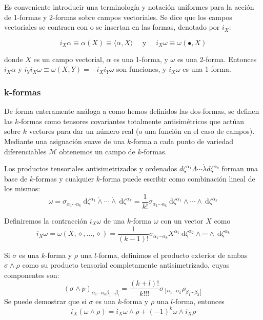 Es conveniente introducir una terminología y notación uniformes para la acción de 1-formas y 2-formas sobre campos vectoriales. Se dice que los campos vectoriales se contraen con o se insertan en las formas, denotado por \( i_{X} \):

$$
i_{X} \alpha \equiv \alpha(X) \equiv \langle \alpha, X \rangle \quad \text { y } \quad i_{X} \omega \equiv \omega(\bullet, X) \tag{5.69}
$$

donde \( X \) es un campo vectorial, \( \alpha \) es una 1-forma, y \( \omega \) es una 2-forma. Entonces \( i_{X} \alpha \) y \( i_{Y} i_{X} \omega \equiv \omega(X, Y) = -i_{X} i_{Y} \omega \) son funciones, y \( i_{X} \omega \) es una 1-forma.
\subsubsection{k-formas}

De forma enteramente análoga a como hemos definidos las dos-formas, se definen las $k$-formas como tensores covariantes totalmente antisimétricos que actúan sobre $k$ vectores para dar un número real (o una función en el caso de campos). Mediante una asignación suave de una $k$-forma a cada punto de variedad diferenciables $\mathscr{M}$ obtenemos un campo de $k$-formas.

Los productos tensoriales antisimetrizados y ordenados $d \zeta^{\alpha_{1}} \dot{\Lambda} \cdots \dot{\lambda} d \zeta^{\alpha_{k}}$ forman una base de $k$-formas y cualquier $k$-forma puede escribir como combinación lineal de los mismos:
$$
\omega=\sigma_{\alpha_{1} \cdots \alpha_{k}} \mathrm{~d} \zeta^{\alpha_{1}} \dot{\wedge} \cdots \dot{\wedge} \mathrm{~d} \zeta^{\alpha_{k}}=\frac{1}{k!} \sigma_{\alpha_{1} \cdots \alpha_{k}} \mathrm{~d} \zeta^{\alpha_{1}} \wedge \cdots \wedge \mathrm{~d} \zeta^{\alpha_{k}}
$$

Definiremos la contracción $i_{X} \omega$ de una $k$-forma $\omega$ con un vector $X$ como
$$
i_{X} \omega=\omega(X, \diamond, \ldots, \diamond)=\frac{1}{(k-1)!} \sigma_{\alpha_{1} \cdots \alpha_{k}} X^{\alpha_{1}} \mathrm{~d} \zeta^{\alpha_{2}} \wedge \cdots \wedge \mathrm{~d} \zeta^{\alpha_{k}}
$$

Si $\sigma$ es una $k$-forma y $\rho$ una $l$-forma, definimos el producto exterior de ambas $\sigma \wedge \rho$ como su producto tensorial completamente antisimetrizado, cuyas componentes son:
$$
(\sigma \wedge p)_{\alpha_{1} \cdots \alpha_{k} \beta_{1} \cdots \beta_{l}}=\frac{(k+l)!}{k!!!} \sigma_{\left[\alpha_{1} \cdots \alpha_{k}\right.} \rho_{\left.\beta_{1} \cdots \beta_{2}\right]}
$$
Se puede demostrar que si $\sigma$ es una $k$-forma y $\rho$ una $l$-forma, entonces
$$
i_{X}(\omega \wedge \rho)=i_{X} \omega \wedge \rho+(-1)^{k} \omega \wedge i_{X} \rho
$$

